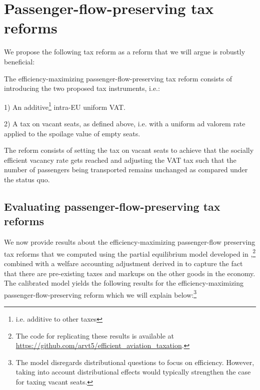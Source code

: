 \documentclass[../../main]{subfiles}
\begin{document}
\section{Passenger-flow-preserving tax reforms }

We propose the following tax reform as a reform that we will argue is robustly beneficial:

\begin{definition}
    The efficiency-maximizing passenger-flow-preserving tax reform consists of introducing the two proposed tax instruments, i.e.:
    
    1) An additive\footnote{i.e. additive to other taxes} intra-EU uniform VAT.
    
    2) A tax on vacant seats, as defined above, i.e. with a uniform ad valorem rate applied to the spoilage value of empty seats. 

    The reform consists of setting the tax on vacant seats to achieve that the socially efficient vacancy rate gets reached and adjusting the VAT tax such that the number of passengers being transported remains unchanged as compared under the status quo.
\end{definition}

\subsection{Evaluating passenger-flow-preserving tax reforms}

We now provide results about the efficiency-maximizing passenger-flow preserving tax reforms that we computed using the partial equilibrium model developed in  \citet{Dörpinghaus_et_al_2026},\footnote{The code for replicating these results is available at \url{https://github.com/arvt5/efficient_aviation_taxation}.} combined with a welfare accounting adjustment derived in \citet{stern2026wedges} to capture the fact that there are pre-existing taxes and markups on the other goods in the economy. The calibrated model yields the following results for the efficiency-maximizing passenger-flow-preserving  reform which we will explain below:\footnote{The model disregards distributional questions to focus on efficiency. However, taking into account distributional effects would typically strengthen the case for taxing vacant seats.}
\end{document}
